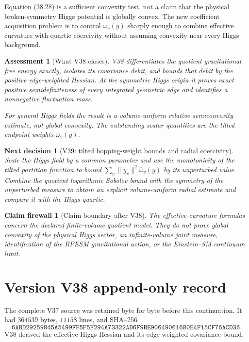 \documentclass[11pt]{article}
\newtheorem{firewall}[theorem]{Claim firewall}
\newtheorem{decision}[theorem]{Next decision}
\newtheorem{assessment}[theorem]{Assessment}
\theoremstyle{remark}
\begin{document}
Equation (38.28) is a sufficient convexity test, not a claim that the
physical broken-symmetry Higgs potential is globally convex.  The new
coefficient acquisition problem is to control
\(\overline\omega_v(y)\) sharply enough to combine effective curvature
with quartic coercivity without assuming convexity near every Higgs
background.

\begin{assessment}[What V38 closes]
\label{ass:v17v38-status}
V38 differentiates the quotient gravitational free energy exactly,
isolates its covariance debit, and bounds that debit by the positive
edge-weighted Hessian.  At the symmetric Higgs origin it proves exact
positive semidefiniteness of every integrated geometric edge and
identifies a nonnegative fluctuation mass.

For general Higgs fields the result is a volume-uniform relative
semiconvexity estimate, not global convexity.  The outstanding scalar
quantities are the tilted endpoint weights
\(\overline\omega_v(y)\).
\end{assessment}

\begin{decision}[V39: tilted hopping-weight bounds and radial coercivity]
\label{dec:v17v38-next}
Scale the Higgs field by a common parameter and use the monotonicity of
the tilted partition function to bound
\(\sum_v\|y_v\|^2\overline\omega_v(y)\) by its
unperturbed value.  Combine the quotient logarithmic Sobolev bound with
the symmetry of the unperturbed measure to obtain an explicit
volume-uniform radial estimate and compare it with the Higgs quartic.
\end{decision}

\begin{firewall}[Claim boundary after V38]
\label{fire:v17v38}
The effective-curvature formulas concern the declared finite-volume
quotient model.  They do not prove global convexity of the physical
Higgs sector, an infinite-volume joint measure, identification of the
RPESM gravitational action, or the Einstein--SM continuum limit.
\end{firewall}

\section*{Version V38 append-only record}
The complete V37 source was retained byte for byte before this
continuation.  It had \(364539\) bytes, \(11158\) lines, and SHA--256
\[
 \texttt{6ABD29259845A5499FF5F5F294A73322AD6F9BE90649061680E4F15CF76ACD36}.
\]
V38 derived the effective Higgs Hessian and its edge-weighted covariance
bound.
\end{document}
